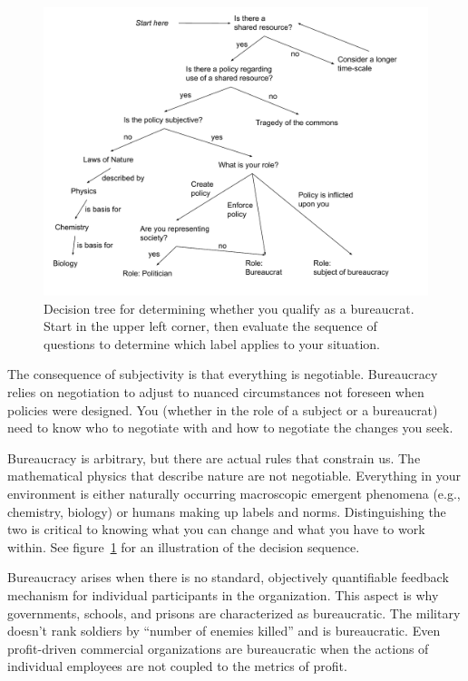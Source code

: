 \begin{figure}
    \centering
    \includegraphics[width=1.05\textwidth]{images/am_I_a_bureaucrat.pdf}
    \caption{Decision tree for determining whether you qualify as a bureaucrat. Start in the upper left corner, then evaluate the sequence of questions to determine which label applies to your situation.}
    \label{fig:am-I-a-bureaucrat}
\end{figure}

The consequence of subjectivity is that everything is negotiable. Bureaucracy relies on negotiation to adjust to nuanced circumstances not foreseen when policies were designed.  You (whether in the role of a subject or a bureaucrat) need to know who to negotiate with and how to negotiate the changes you seek. 

Bureaucracy is arbitrary, but there are actual rules that constrain us. The mathematical physics that describe nature are not negotiable. Everything in your environment is either naturally occurring macroscopic emergent phenomena (e.g., chemistry, biology) or humans making up labels and norms. Distinguishing the two is critical to knowing what you can change and what you have to work within. See figure~\ref{fig:am-I-a-bureaucrat}\iftoggle{haspagenumbers}{ on page~\pageref{fig:am-I-a-bureaucrat}}{} for an illustration of the decision sequence.

Bureaucracy arises when there is no standard, objectively quantifiable feedback mechanism for individual participants in the organization. This aspect is why governments, schools, and prisons are characterized as bureaucratic. 
The military doesn't rank soldiers by ``number of enemies killed'' and is bureaucratic. 
Even profit-driven commercial organizations are bureaucratic when the actions of individual employees are not coupled to the metrics of profit. %

